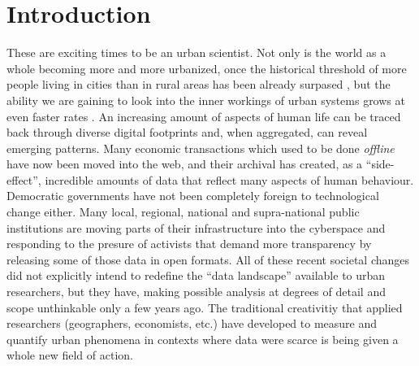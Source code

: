 \documentclass[12pt]{article}
\begin{document}
\section{Introduction}
These are exciting times to be an urban scientist. Not only is the world as a
whole becoming more and more urbanized, once the historical threshold of more
people living in cities than in rural areas has been already surpased
\citep{wup2007highlights}, but the ability we are gaining to look into the
inner workings of urban systems grows at even faster rates
\citep{batty2012smart}.
An increasing amount of aspects of human life can be traced back through
diverse digital footprints and, when aggregated, can reveal emerging patterns.
Many economic transactions which used to be done
\emph{offline} have now been moved into the web, and their archival has created,
as a ``side-effect'', incredible amounts of data that reflect many aspects of
human behaviour.
Democratic governments have not been completely foreign to
technological change either. Many local, regional, national and supra-national public
institutions are moving parts of their infrastructure into the cyberspace and responding to
the presure of activists that demand more transparency by
releasing some of those data in open formats.
%
All of these recent societal changes did not explicitly intend to redefine the
``data landscape'' available to urban researchers, but they have, making
possible analysis at degrees of detail and scope unthinkable only a few years
ago.
The traditional creativitiy that applied researchers (geographers,
economists, etc.) have developed to measure and quantify urban phenomena in
contexts where data were scarce is being given a whole new field of action. 
%
\end{document}
